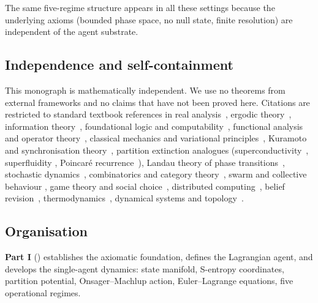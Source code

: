 \documentclass[11pt,twocolumn,a4paper]{article}
\begin{document}
The same five-regime structure appears in all these settings because the
underlying axioms (bounded phase space, no null state, finite resolution)
are independent of the agent substrate.

\subsection{Independence and self-containment}

This monograph is mathematically independent. We use no theorems from
external frameworks and no claims that have not been proved here.
Citations are restricted to standard textbook references in real
analysis~\cite{rudin1987,halmos1950}, ergodic
theory~\cite{walters1982,birkhoff1931}, information
theory~\cite{shannon1948,coverthomas2006,kullback1951,fisher1925},
foundational logic and computability~\cite{godel1931,tarski1933,
turing1936,chaitin1974}, functional analysis and operator
theory~\cite{banach1922,koopman1931,stone1936},
classical mechanics and variational
principles~\cite{arnold1989,goldstein2002,onsager1953,machlup1953,
graham1977,noether1918}, Kuramoto and synchronisation
theory~\cite{kuramoto1984,kuramoto1975,strogatz2000,acebron2005,
pikovsky2001}, partition extinction analogues
(superconductivity~\cite{onnes1911,bardeen1957,cooper1956}, superfluidity
\cite{landau1941}, Poincaré
recurrence~\cite{poincare1890}), Landau theory of phase
transitions~\cite{landau1937,landaulifshitz1980}, stochastic
dynamics~\cite{kramers1940,vankampen2007,gardiner2009},
combinatorics and category
theory~\cite{maclane1998,birkhoff1967,andrews1976,stanley2011,awodey2010,
barrwells1990,howie1995}, swarm and collective behaviour
\cite{vicsek1995,couzin2002,strogatz2003}, game theory and social
choice~\cite{vonneumannmorgenstern1944,nash1951,schelling1960,aumann1976,
lewis1969,arrow1951,harsanyi1977}, distributed
computing~\cite{fischer1985,lamport1982,lynch1996,shoham2008}, belief
revision~\cite{alchourron1985,fagin1995},
thermodynamics~\cite{boltzmann1877,landauer1961,bennett1973}, dynamical
systems and topology~\cite{khalil2002,teschl2012,nakahara2003,
kelley1955,munkres2000}.

\subsection{Organisation}

\textbf{Part I} () establishes
the axiomatic foundation, defines the Lagrangian agent, and develops the
single-agent dynamics: state manifold, S-entropy coordinates, partition
potential, Onsager--Machlup action, Euler--Lagrange equations, five
operational regimes.
\end{document}
